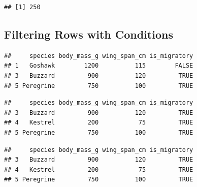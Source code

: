 \documentclass[
]{article}
\newenvironment{Shaded}{\begin{snugshade}}{\end{snugshade}}
\newcommand{\CommentTok}[1]{\textcolor[rgb]{0.56,0.35,0.01}{\textit{#1}}}
\newcommand{\ConstantTok}[1]{\textcolor[rgb]{0.56,0.35,0.01}{#1}}
\newcommand{\DecValTok}[1]{\textcolor[rgb]{0.00,0.00,0.81}{#1}}
\newcommand{\NormalTok}[1]{#1}
\newcommand{\SpecialCharTok}[1]{\textcolor[rgb]{0.81,0.36,0.00}{\textbf{#1}}}
\begin{document}
\begin{verbatim}
## [1] 250
\end{verbatim}

\subsection{Filtering Rows with
Conditions}\label{filtering-rows-with-conditions}

\begin{Shaded}
\end{Shaded}

\begin{verbatim}
##     species body_mass_g wing_span_cm is_migratory
## 1   Goshawk        1200          115        FALSE
## 3   Buzzard         900          120         TRUE
## 5 Peregrine         750          100         TRUE
\end{verbatim}

\begin{Shaded}
\end{Shaded}

\begin{verbatim}
##     species body_mass_g wing_span_cm is_migratory
## 3   Buzzard         900          120         TRUE
## 4   Kestrel         200           75         TRUE
## 5 Peregrine         750          100         TRUE
\end{verbatim}

\begin{Shaded}
\end{Shaded}

\begin{verbatim}
##     species body_mass_g wing_span_cm is_migratory
## 3   Buzzard         900          120         TRUE
## 4   Kestrel         200           75         TRUE
## 5 Peregrine         750          100         TRUE
\end{verbatim}
\end{document}
